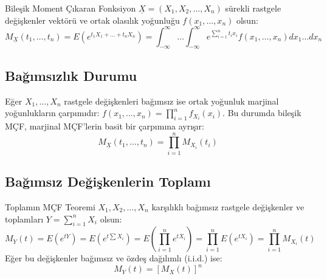 \documentclass[12pt,a4paper]{article}
\begin{document}
\begin{tanim}{Bileşik Moment Çıkaran Fonksiyon}
$\underline{X} = (X_1, X_2, \dots, X_n)$ sürekli rastgele değişkenler vektörü ve ortak olasılık yoğunluğu $f(x_1, \dots, x_n)$ olsun:
\begin{equation}
    M_{\underline{X}}(t_1, \dots, t_n) = E\left( e^{t_1 X_1 + \dots + t_n X_n} \right) = \int_{-\infty}^\infty \dots \int_{-\infty}^\infty e^{\sum_{i=1}^n t_i x_i} f(x_1, \dots, x_n) dx_1 \dots dx_n
\end{equation}
\end{tanim}

\subsection{Bağımsızlık Durumu}
Eğer $X_1, \dots, X_n$ rastgele değişkenleri bağımsız ise ortak yoğunluk marjinal yoğunlukların çarpımıdır: $f(x_1,\dots,x_n) = \prod_{i=1}^n f_{X_i}(x_i)$.  
Bu durumda bileşik MÇF, marjinal MÇF'lerin basit bir çarpımına ayrışır:
\begin{equation}
    M_{\underline{X}}(t_1, \dots, t_n) = \prod_{i=1}^n M_{X_i}(t_i)
\end{equation}

\subsection{Bağımsız Değişkenlerin Toplamı}
\begin{teorem}{Toplamın MÇF Teoremi}
$X_1, X_2, \dots, X_n$ karşılıklı bağımsız rastgele değişkenler ve toplamları $Y = \sum_{i=1}^n X_i$ olsun:
\begin{equation}
    M_Y(t) = E(e^{tY}) = E\left(e^{t \sum X_i}\right) = E\left( \prod_{i=1}^n e^{t X_i} \right) = \prod_{i=1}^n E(e^{t X_i}) = \prod_{i=1}^n M_{X_i}(t)
\end{equation}
Eğer bu değişkenler bağımsız ve özdeş dağılımlı (i.i.d.) ise:
\begin{equation}
    M_Y(t) = \left[ M_X(t) \right]^n
\end{equation}
\end{teorem}
\end{document}
